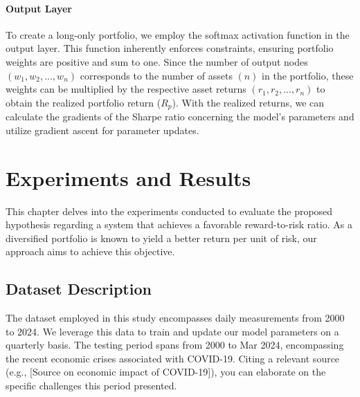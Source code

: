 \subsubsection{Output Layer}

To create a long-only portfolio, we employ the softmax activation function in the output layer. This function inherently enforces constraints, ensuring portfolio weights are positive and sum to one. Since the number of output nodes $(w_1, w_2, ..., w_n)$ corresponds to the number of assets $(n)$ in the portfolio, these weights can be multiplied by the respective asset returns $(r_1, r_2, ..., r_n)$ to obtain the realized portfolio return ($R_p$). With the realized returns, we can calculate the gradients of the Sharpe ratio concerning the model's parameters and utilize gradient ascent for parameter updates.

\label{fig:network_architecture}


\chapter{Experiments and Results}

This chapter delves into the experiments conducted to evaluate the proposed hypothesis regarding a system that achieves a favorable reward-to-risk ratio. As a diversified portfolio is known to yield a better return per unit of risk, our approach aims to achieve this objective.

\section{Dataset Description}

The dataset employed in this study encompasses daily measurements from 2000 to 2024. We leverage this data to train and update our model parameters on a quarterly basis. The testing period spans from 2000 to Mar 2024, encompassing the recent economic crises associated with COVID-19. Citing a relevant source (e.g., [Source on economic impact of COVID-19]), you can elaborate on the specific challenges this period presented.

